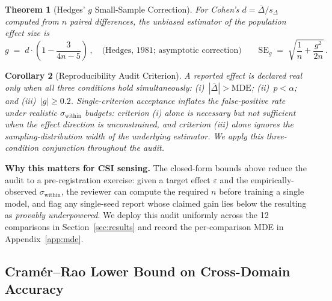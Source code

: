 \documentclass[11pt]{article}
\newtheorem{theorem}{Theorem}
\newtheorem{corollary}[theorem]{Corollary}
\theoremstyle{definition}
\newcommand{\MDE}{\text{MDE}}
\begin{document}
\begin{theorem}[Hedges' $g$ Small-Sample Correction]
\label{thm:hedges}
For Cohen's $d = \bar{\Delta}/s_\Delta$ computed from $n$ paired differences, the unbiased estimator of the population effect size is
\begin{equation}
    g \;=\; d \cdot \left( 1 - \frac{3}{4n - 5} \right)\,, \quad \text{(Hedges, 1981; asymptotic correction)}
    \qquad \mathrm{SE}_g \;=\; \sqrt{\frac{1}{n} + \frac{g^2}{2n}}\,.
    \label{eq:hedges_eq}
\end{equation}
\end{theorem}

\begin{corollary}[Reproducibility Audit Criterion]
\label{cor:audit_criterion}
A reported effect is declared \emph{real} only when all three conditions hold simultaneously: (i)~$|\bar{\Delta}| > \MDE{}$; (ii)~$p < \alpha$; and (iii)~$|g| \ge 0.2$. Single-criterion acceptance inflates the false-positive rate under realistic $\sigma_\text{within}$ budgets: criterion (i) alone is necessary but not sufficient when the effect direction is unconstrained, and criterion (iii) alone ignores the sampling-distribution width of the underlying estimator. \emph{We apply this three-condition conjunction throughout the audit.}
\end{corollary}

\noindent\textbf{Why this matters for CSI sensing.} The closed-form bounds above reduce the audit to a pre-registration exercise: given a target effect $\varepsilon$ and the empirically-observed $\sigma_\text{within}$, the reviewer can compute the required $n$ before training a single model, and flag any single-seed report whose claimed gain lies below the resulting \MDE{} as \emph{provably underpowered}. We deploy this audit uniformly across the 12 comparisons in Section~\ref{sec:results} and record the per-comparison MDE in Appendix~\ref{app:mde}.

\subsection{Cram\'er--Rao Lower Bound on Cross-Domain Accuracy}
\label{sec:crlb-summary}
\end{document}
